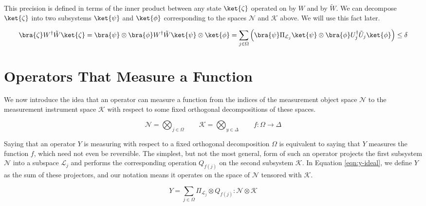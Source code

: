 \documentclass{article}
\theoremstyle{definition} \newtheorem{lemma}{Lemma}
\theoremstyle{definition} \newtheorem{theorem}{Theorem}
\begin{document}
This precision is defined in terms of the inner product between any state
$\ket{\zeta}$
operated
on by $W$ and by $\tilde{W}$. We can decompose $\ket{\zeta}$ into
two subsystems $\ket{\psi}$ and $\ket{\phi}$
corresponding to the spaces $\mathcal{N}$ and $\mathcal{K}$
above. We will use this fact later.

\begin{equation}
\bra{\zeta} W^{\dag} \tilde{W} \ket{\zeta} =
\bra{\psi} \otimes \bra{\phi} W^{\dag} \tilde{W} \ket{\psi} \otimes \ket{\phi} =
\sum_{j \in \Omega} \left( \bra{\psi} \Pi_{\mathcal{L}_j} \ket{\psi} \otimes
\bra{\phi} U^{\dag}_j \tilde{U}_j \ket{\phi} \right) \le \delta
\end{equation}

\section{Operators That Measure a Function}
\label{sec:meas-func}

We now introduce the idea that an operator can measure a function
from the indices of the measurement object space $\mathcal{N}$
to the measurement instrument space $\mathcal{K}$ with respect to
some fixed orthogonal decompositions of these spaces.

\begin{equation}
\mathcal{N} = \bigotimes_{j \in \Omega} \qquad
\mathcal{K} = \bigotimes_{y \in \Delta} \qquad
f:\Omega \rightarrow \Delta
\end{equation}

Saying that an operator $Y$ is measuring with respect to a fixed
orthogonal decomposition $\Omega$ is equivalent to saying that
$Y$ measures the function $f$, which need not even be reversible.
The simplest, but not the most general, form of such an operator projects
the first subsystem $\mathcal{N}$ into a subspace $\mathcal{L}_j$
and performs the
corresponding operation $Q_{f(j)}$ on the second subsystem $\mathcal{K}$.
In Equation \ref{eqn:y-ideal}, we define $Y$ as the sum of these projectors,
and our notation means it operates on the space of $\mathcal{N}$
tensored with $\mathcal{K}$.

\begin{equation}
Y = \sum_{j \in \Omega} \Pi_{\mathcal{L}_j} \otimes Q_{f(j)} : \mathcal{N} \otimes \mathcal{K}
\label{eqn:y-ideal}
\end{equation}
\end{document}
